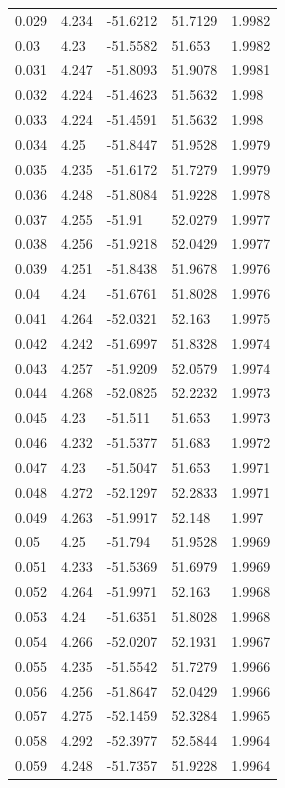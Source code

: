\begin{tabular}{lllll}
0.029 & 4.234 & -51.6212 & 51.7129 & 1.9982 \\
0.03 & 4.23 & -51.5582 & 51.653 & 1.9982 \\
0.031 & 4.247 & -51.8093 & 51.9078 & 1.9981 \\
0.032 & 4.224 & -51.4623 & 51.5632 & 1.998 \\
0.033 & 4.224 & -51.4591 & 51.5632 & 1.998 \\
0.034 & 4.25 & -51.8447 & 51.9528 & 1.9979 \\
0.035 & 4.235 & -51.6172 & 51.7279 & 1.9979 \\
0.036 & 4.248 & -51.8084 & 51.9228 & 1.9978 \\
0.037 & 4.255 & -51.91 & 52.0279 & 1.9977 \\
0.038 & 4.256 & -51.9218 & 52.0429 & 1.9977 \\
0.039 & 4.251 & -51.8438 & 51.9678 & 1.9976 \\
0.04 & 4.24 & -51.6761 & 51.8028 & 1.9976 \\
0.041 & 4.264 & -52.0321 & 52.163 & 1.9975 \\
0.042 & 4.242 & -51.6997 & 51.8328 & 1.9974 \\
0.043 & 4.257 & -51.9209 & 52.0579 & 1.9974 \\
0.044 & 4.268 & -52.0825 & 52.2232 & 1.9973 \\
0.045 & 4.23 & -51.511 & 51.653 & 1.9973 \\
0.046 & 4.232 & -51.5377 & 51.683 & 1.9972 \\
0.047 & 4.23 & -51.5047 & 51.653 & 1.9971 \\
0.048 & 4.272 & -52.1297 & 52.2833 & 1.9971 \\
0.049 & 4.263 & -51.9917 & 52.148 & 1.997 \\
0.05 & 4.25 & -51.794 & 51.9528 & 1.9969 \\
0.051 & 4.233 & -51.5369 & 51.6979 & 1.9969 \\
0.052 & 4.264 & -51.9971 & 52.163 & 1.9968 \\
0.053 & 4.24 & -51.6351 & 51.8028 & 1.9968 \\
0.054 & 4.266 & -52.0207 & 52.1931 & 1.9967 \\
0.055 & 4.235 & -51.5542 & 51.7279 & 1.9966 \\
0.056 & 4.256 & -51.8647 & 52.0429 & 1.9966 \\
0.057 & 4.275 & -52.1459 & 52.3284 & 1.9965 \\
0.058 & 4.292 & -52.3977 & 52.5844 & 1.9964 \\
0.059 & 4.248 & -51.7357 & 51.9228 & 1.9964 \\

\end{tabular}
